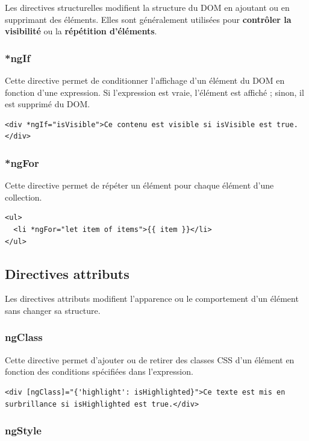 \documentclass{article}
\begin{document}
Les directives structurelles modifient la structure du DOM en ajoutant ou en supprimant des éléments. Elles sont généralement utilisées pour \textbf{contrôler la visibilité} ou la \textbf{répétition d'éléments}.

\subsubsection{*ngIf}

Cette directive permet de conditionner l’affichage d’un élément du DOM en fonction d’une expression. Si l'expression est vraie, l'élément est affiché ; sinon, il est supprimé du DOM.
\begin{verbatim}
<div *ngIf="isVisible">Ce contenu est visible si isVisible est true.</div>
\end{verbatim}

\subsubsection{*ngFor}

Cette directive permet de répéter un élément pour chaque élément d’une collection.
\begin{verbatim}
<ul>
  <li *ngFor="let item of items">{{ item }}</li>
</ul>
\end{verbatim}

\subsection{Directives attributs}

Les directives attributs modifient l’apparence ou le comportement d’un élément sans changer sa structure.

\subsubsection{ngClass}

Cette directive permet d’ajouter ou de retirer des classes CSS d’un élément en fonction des conditions spécifiées dans l’expression.
\begin{verbatim}
<div [ngClass]="{'highlight': isHighlighted}">Ce texte est mis en surbrillance si isHighlighted est true.</div>
\end{verbatim}

\subsubsection{ngStyle}
\end{document}
